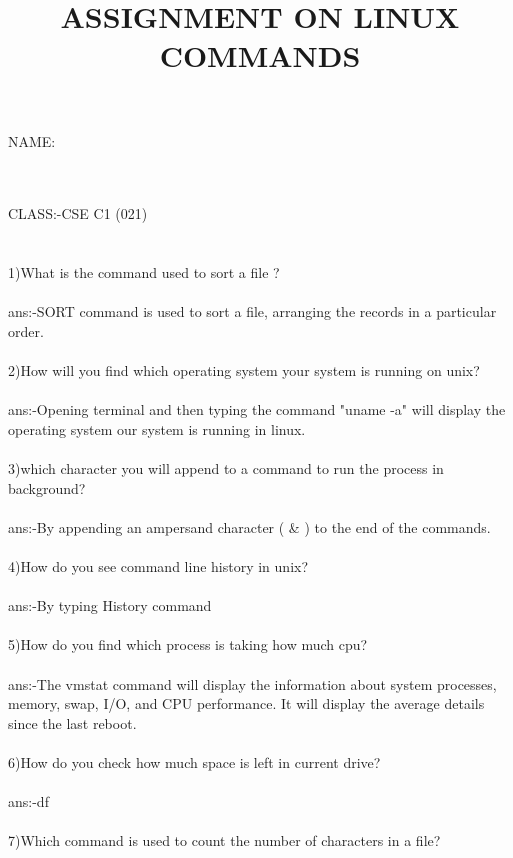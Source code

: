 \documentclass{article}
\begin{document}
\title{ASSIGNMENT ON LINUX COMMANDS}

\maketitle

\Large NAME: \author {\Large \color {purple}{S.Sandhya , ID : B192568}}
\\ \\
CLASS:-CSE C1 (021)\\ \\
\Large{
\\1)What is the command used to sort a file ?\\ \\
ans:-SORT command is used to sort a file, arranging the records in a particular order.\\ \\
2)How will you find which operating system your system is running on unix?\\ \\
ans:-Opening terminal and then typing the command "uname -a" will display the operating system
our system is running in linux.\\ \\
3)which character you will append to a command to run the process in background?\\ \\
ans:-By appending an ampersand character ( & ) to the end of the commands.\\ \\
4)How do you see command line history in unix?\\ \\
ans:-By typing History command\\ \\
5)How do you find which process is taking how much cpu?\\ \\
ans:-The vmstat command will display the information about system processes, memory, swap, I/O,
and CPU performance. It will display the average details since the last reboot.\\ \\
6)How do you check how much space is left in current drive?\\ \\
ans:-df\\ \\
7)Which command is used to count the number of characters in a file?\\ \\
}
\end{document}
